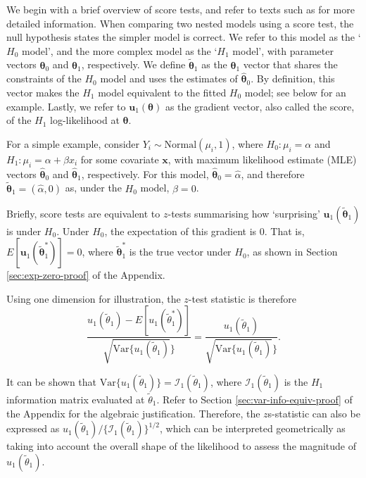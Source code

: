 \documentclass{article}
\newcommand{\thetaZero}{\boldsymbol{\theta}_0}
\newcommand{\thetaZeroMLE}{\hat{\boldsymbol{\theta}}_0}
\newcommand{\thetaOne}{\boldsymbol{\theta}_1}
\newcommand{\thetaOneTilde}{\tilde{\boldsymbol{\theta}}_1}
\newcommand{\thetaOneTildeOD}{\tilde{\theta}_1} %
\newcommand{\thetaOneMLE}{\hat{\boldsymbol{\theta}}_1}
\newcommand{\scoreU}{\boldsymbol{u}_1 (\thetaOneTilde)}
\newcommand{\scoreUOneDim}{u_1 (\thetaOneTildeOD)}
\begin{document}
We begin with a brief overview of score tests, and refer to texts such
as \textcite{rao2005} for more detailed information. When
comparing two nested models 
using a score test, the null hypothesis 
states the simpler model is correct. We refer to this
 model as the `$H_0$ model', and the more complex model as the `$H_1$
model', with parameter vectors $\thetaZero$ and
$\thetaOne$, respectively. We define $\thetaOneTilde$ as the
$\thetaOne$ vector that shares the constraints of the $H_0$ model and
uses the estimates of $\thetaZeroMLE$. By definition, this vector
makes the $H_1$ model equivalent to the fitted $H_0$
model; see below for an example. Lastly, we refer to $\boldsymbol{u}_1
(\boldsymbol{\theta})$ as the gradient 
vector, also called the score, of the $H_1$ log-likelihood at
$\boldsymbol{\theta}$.

For a simple example, consider $Y_i \sim
\text{Normal}(\mu_i, 1)$, where $H_0: \mu_i = \alpha$ and $H_1: \mu_i
= \alpha + \beta x_i$ for some covariate $\boldsymbol{x}$, with
maximum likelihood estimate (MLE) vectors $\thetaZeroMLE$ and
$\thetaOneMLE$, respectively. For this model, $\thetaZeroMLE =
\hat{\alpha}$, and therefore 
$\thetaOneTilde = (\hat{\alpha}, 0)$ as, under the $H_0$
model, $\beta=0$.

Briefly, score tests are equivalent to $z$-tests summarising how `surprising'
$\scoreU$ is under $H_0$. Under $H_0$, the
expectation of this gradient is 
$0$. That is, $E[\boldsymbol{u}_1
(\thetaOneTilde^*)]=0$, where $\thetaOneTilde^*$ is the true
vector under $H_0$, as shown in Section \ref{sec:exp-zero-proof} of
the Appendix.

Using one dimension for illustration, the $z$-test
statistic is therefore
$$
\frac{\scoreUOneDim - E[u_1(\thetaOneTildeOD^*)]}
{\sqrt{\text{Var}\{\scoreUOneDim}\}}  =
\frac{\scoreUOneDim}{\sqrt{\text{Var}\{\scoreUOneDim}\}}.
$$

It can be shown that $\text{Var}\{\scoreUOneDim\} =
\mathcal{I}_1(\thetaOneTildeOD)$, where $\mathcal{I}_1(\thetaOneTildeOD)$ is
the $H_1$ information matrix evaluated
at $\thetaOneTildeOD$. Refer to Section
\ref{sec:var-info-equiv-proof} of the Appendix for the algebraic
justification. Therefore, the $z$s-statistic can also be expressed as
$\scoreUOneDim / \{\mathcal{I}_1(\thetaOneTildeOD)\}^{1/2}$, which can be interpreted
geometrically as taking into account the
overall shape of the likelihood to
assess the magnitude of $\scoreUOneDim$. 
\end{document}
